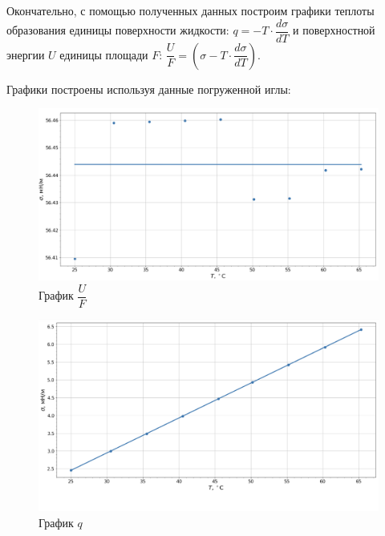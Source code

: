 \documentclass[a4paper,12pt]{article}
\theoremstyle{definition}
\begin{document}
	Окончательно, с помощью полученных данных построим графики теплоты образования единицы поверхности жидкости: $q = - T\cdot\dfrac{d\sigma}{dT}$ и поверхностной энергии $U$ единицы площади $F$: $\dfrac{U}{F} = \left(\sigma - T\cdot\dfrac{d\sigma}{dT}\right)$.
	
	Графики построены используя данные погруженной иглы:
	\begin{table}[H]
		\centering
		\begin{minipage}{.49\linewidth}
			\centering
			\begin{figure}[H]
				\centering
				\includegraphics[scale = 0.25]{u}
				\caption{График $\dfrac{U}{F}$}
				\label{graph4}
			\end{figure}
		\end{minipage}
		\begin{minipage}{.49\linewidth}
			\centering
			\begin{figure}[H]
				\centering
				\includegraphics[scale = 0.25]{q}
				\caption{График $q$}
				\label{graph5}
			\end{figure}
		\end{minipage}
	\end{table}
\end{document}
